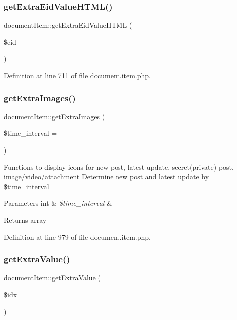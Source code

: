 \subsubsection{\texorpdfstring{get\+Extra\+Eid\+Value\+H\+T\+M\+L()}{getExtraEidValueHTML()}}
{\footnotesize\ttfamily document\+Item\+::get\+Extra\+Eid\+Value\+H\+T\+ML (\begin{DoxyParamCaption}\item[{}]{\$eid }\end{DoxyParamCaption})}



Definition at line 711 of file document.\+item.\+php.

\mbox{\label{classdocumentItem_a0f72df4345359453aa01ff1490071c5a}} 
\subsubsection{\texorpdfstring{get\+Extra\+Images()}{getExtraImages()}}
{\footnotesize\ttfamily document\+Item\+::get\+Extra\+Images (\begin{DoxyParamCaption}\item[{}]{\$time\+\_\+interval = {} }\end{DoxyParamCaption})}

Functions to display icons for new post, latest update, secret(private) post, image/video/attachment Determine new post and latest update by \$time\+\_\+interval 
\begin{DoxyParams}[1]{Parameters}
int & {\em \$time\+\_\+interval} & \\
\hline
\end{DoxyParams}
\begin{DoxyReturn}{Returns}
array 
\end{DoxyReturn}


Definition at line 979 of file document.\+item.\+php.

\mbox{\label{classdocumentItem_a5b0cd52819bcb058a7e8a6764aef79d1}} 
\subsubsection{\texorpdfstring{get\+Extra\+Value()}{getExtraValue()}}
{\footnotesize\ttfamily document\+Item\+::get\+Extra\+Value (\begin{DoxyParamCaption}\item[{}]{\$idx }\end{DoxyParamCaption})}



